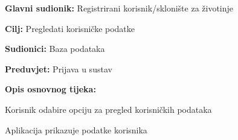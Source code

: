 					\noindent {}
					\begin{packed_item}
	
						\item \textbf{Glavni sudionik:} Registrirani korisnik/sklonište za životinje
						\item  \textbf{Cilj:} Pregledati korisničke podatke
						\item  \textbf{Sudionici:} Baza podataka
						\item  \textbf{Preduvjet:} Prijava u sustav
						\item  \textbf{Opis osnovnog tijeka:}
						
						\item[] \begin{packed_enum}
	
							\item Korisnik odabire opciju za pregled korisničkih podataka
							\item Aplikacija prikazuje podatke korisnika
						\end{packed_enum}
					\end{packed_item}
					
